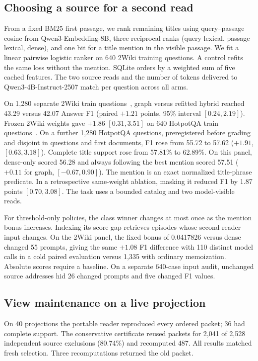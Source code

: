 \documentclass[conference]{IEEEtran}
\begin{document}
\subsection{Choosing a source for a second read}
From a fixed BM25 first passage, we rank remaining titles using query--passage cosine from Qwen3-Embedding-8B, three reciprocal ranks (query lexical, passage lexical, dense), and one bit for a title mention in the visible passage. We fit a linear pairwise logistic ranker on 640 2Wiki training questions. A control refits the same loss without the mention. SQLite orders by a weighted sum of five cached features. The two source reads and the number of tokens delivered to Qwen3-4B-Instruct-2507 match per question across all arms.

On 1,280 separate 2Wiki train questions~\cite{ho2wiki}, graph versus refitted hybrid reached 43.29 versus 42.07 Answer F1 (paired $+1.21$ points, 95\% interval $[0.24,2.19]$). Frozen 2Wiki weights gave $+1.86$ $[0.31,3.51]$ on 640 HotpotQA train questions~\cite{hotpot}. On a further 1,280 HotpotQA questions, preregistered before grading and disjoint in questions and first documents, F1 rose from 55.72 to 57.62 ($+1.91$, $[0.63,3.18]$). Complete title support rose from 57.81\% to 62.89\%. On this panel, dense-only scored 56.28 and always following the best mention scored 57.51 ($+0.11$ for graph, $[-0.67,0.90]$). The mention is an exact normalized title-phrase predicate. In a retrospective same-weight ablation, masking it reduced F1 by 1.87 points $[0.70,3.08]$. The task uses a bounded catalog and two model-visible reads.

For threshold-only policies, the class winner changes at most once as the mention bonus increases. Indexing its score gap retrieves episodes whose second reader input changes. On the 2Wiki panel, the fixed bonus of 0.0417826 versus dense changed 55 prompts, giving the same $+1.08$ F1 difference with 110 distinct model calls in a cold paired evaluation versus 1,335 with ordinary memoization. Absolute scores require a baseline. On a separate 640-case input audit, unchanged source addresses hid 26 changed prompts and five changed F1 values.

\subsection{View maintenance on a live projection}
On 40 projections the portable reader reproduced every ordered packet; 36 had complete support. The conservative certificate reused packets for 2,041 of 2,528 independent source exclusions (80.74\%) and recomputed 487. All results matched fresh selection. Three recomputations returned the old packet.
\end{document}

